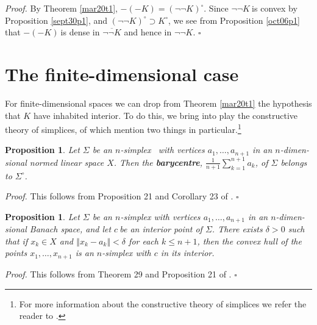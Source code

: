 \documentclass[11pt]{article}%
\newtheorem{proposition}[theorem]{Proposition}
\newenvironment{proof}[1][Proof]{\noindent\textit{#1.} }{}
\begin{document}
\begin{proof}
By Theorem \ref{mar20t1}, $-(-K)=\left(  \lnot\lnot K\right)  ^{\circ}$. Since
$\lnot\lnot K\ $is convex by Proposition \ref{sept30p1}, and $\left(
\lnot\lnot K\right)  ^{\circ}\supset K^{\circ}$, we see from Proposition
\ref{oct06p1} that $-(-K)\ $is dense in $\overline{\lnot\lnot K}$ and hence in
$\lnot\lnot K$.%
\hfill
$\square$
\end{proof}

\section{The finite-dimensional case}

For finite-dimensional spaces we can drop from Theorem \ref{mar20t1} the
hypothesis that $K$ have inhabited interior. To do this, we bring into play
the constructive theory of simplices, of which mention two things in
particular.\footnote{%
\normalfont\sf
For more information about the constructive theory of simplices we refer the
reader to \cite{DSBsimplex}.}

\begin{proposition}
\label{sept15p1}Let $\Sigma$ be an $n$-simplex \ with vertices $a_{1}%
,\ldots,a_{n+1}$ in an $n$-dimen- sional normed linear space $X$. Then the
\textbf{barycentre}, $\frac{1}{n+1}\sum_{k=1}^{n+1}a_{k}$, of $\Sigma$ belongs
to $\Sigma^{\circ}$.
\end{proposition}

\begin{proof}
This follows from Proposition 21 and Corollary 23 of \cite{DSBsimplex}.%
\hfill
$\square$
\end{proof}

\begin{proposition}
\label{sept16c1}Let $\Sigma$ be an $n$-simplex with vertices $a_{1}%
,\ldots,a_{n+1}$ in an $n$-dimen- sional Banach space, and let $c\ $be an
interior point of $\Sigma$. There exists $\delta>0$ such that if $x_{k}\in X$
and $\left\Vert x_{k}-a_{k}\right\Vert <\delta$ for each $k\leq n+1$, then the
convex hull of the points $x_{1},\ldots,x_{n+1}$ is an $n$-simplex with $c$ in
its interior.
\end{proposition}

\begin{proof}
This follows from Theorem 29 and Proposition 21 of \cite{DSBsimplex}.%
\hfill
$\square$
\end{proof}
\end{document}
